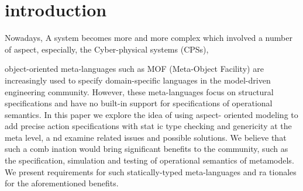 \section{introduction}
Nowadays, A system becomes more and more complex which involved a number of aspect, especially, the Cyber-physical systems (CPSs), 


object-oriented  meta-languages such as MOF (Meta-Object Facility) are increasingly used to  specify domain-specific languages in  the   model-driven   engineering   community.   However,   these   meta-languages focus on structural specifications and have no built-in support for specifications 
of  operational  semantics.  In  this  paper  
we  explore  the  idea  of  using  aspect-
oriented modeling to add precise action specifications with stat
ic type checking 
and  genericity  at  the  meta  level,  a
nd  examine  related  issues  and  possible  
solutions. We believe that such a comb
ination would bring significant benefits 
to   the   community,   such   as   the   specification,   simulation   and   testing   of   
operational   semantics   of   
metamodels.   We   present   requirements   for   such   
statically-typed meta-languages and ra
tionales for the aforementioned benefits. 